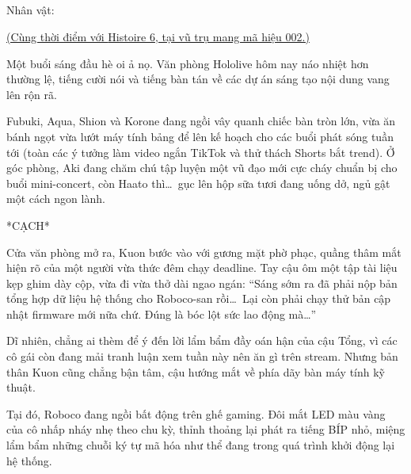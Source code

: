 \documentclass[../main.tex]{subfiles}
\begin{document}
\subsection*{\label{ep-C2.VII}}
\begin{center}
  {\caviar\fontsize{12pt}{12pt}\selectfont Nhân vật:                    }
\end{center}

\begin{center}
  \uline{(Cùng thời điểm với {\sen Histoire 6}, tại vũ trụ mang mã hiệu 002.)}
\end{center}

Một buổi sáng đầu hè oi ả nọ. Văn phòng Hololive hôm nay náo nhiệt hơn thường lệ, tiếng cười nói và tiếng bàn tán về các dự án sáng tạo nội dung vang lên rộn rã.

Fubuki, Aqua, Shion và Korone đang ngồi vây quanh chiếc bàn tròn lớn, vừa ăn bánh ngọt vừa lướt máy tính bảng để lên kế hoạch cho các buổi phát sóng tuần tới (toàn các ý tưởng làm video ngắn TikTok và thử thách Shorts bắt trend). Ở góc phòng, Aki đang chăm chú tập luyện một vũ đạo mới cực cháy chuẩn bị cho buổi mini-concert, còn Haato thì\dots\ gục lên hộp sữa tươi đang uống dở, ngủ gật một cách ngon lành.

*CẠCH*

Cửa văn phòng mở ra, Kuon bước vào với gương mặt phờ phạc, quầng thâm mắt hiện rõ của một người vừa thức đêm chạy deadline. Tay cậu ôm một tập tài liệu kẹp ghim dày cộp, vừa đi vừa thở dài ngao ngán: ``Sáng sớm ra đã phải nộp bản tổng hợp dữ liệu hệ thống cho Roboco-san rồi\dots\ Lại còn phải chạy thử bản cập nhật firmware mới nữa chứ. Đúng là bóc lột sức lao động mà\dots''

Dĩ nhiên, chẳng ai thèm để ý đến lời lẩm bẩm đầy oán hận của cậu Tổng, vì các cô gái còn đang mải tranh luận xem tuần này nên ăn gì trên stream. Nhưng bản thân Kuon cũng chẳng bận tâm, cậu hướng mắt về phía dãy bàn máy tính kỹ thuật.

Tại đó, Roboco đang ngồi bất động trên ghế gaming. Đôi mắt LED màu vàng của cô nhấp nháy nhẹ theo chu kỳ, thỉnh thoảng lại phát ra tiếng BÍP nhỏ, miệng lẩm bẩm những chuỗi ký tự mã hóa như thể đang trong quá trình khởi động lại hệ thống.
\end{document}
